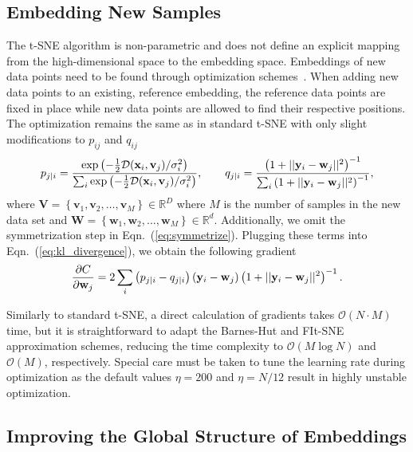 \documentclass[article]{jss}
\begin{document}
\subsection{Embedding New Samples} \label{sec:meth.transform}

The t-SNE algorithm is non-parametric and does not define an explicit mapping from the
high-dimensional space to the embedding space. Embeddings of new data
points need to be found through optimization
schemes~\citep{policar2021embedding}. When adding new data points to an
existing, reference embedding, the reference data points are fixed in place
while new data points are allowed to find their respective positions. The
optimization remains the same as in standard t-SNE with only slight
modifications to $p_{ij}$ and $q_{ij}$
\begin{align}
p_{j \mid i} = \frac{\exp \left ( -\frac{1}{2} \mathcal{D}(\mathbf{x}_i, \mathbf{v}_j) /  \sigma_i^2 \right )}{\sum_{i} \exp \left ( -\frac{1}{2} \mathcal{D}(\mathbf{x}_i, \mathbf{v}_j) / \sigma_i^2 \right )}, \qquad
q_{j \mid i} = \frac{\left ( 1 + || \mathbf{y}_i - \mathbf{w}_j ||^2 \right )^{-1}}{\sum_{i}\left ( 1 + || \mathbf{y}_i - \mathbf{w}_j ||^2 \right )^{-1}}, \notag
\end{align}
\noindent where $\mathbf{V} = \left \{ \mathbf{v}_1, \mathbf{v}_2, \dots,
\mathbf{v}_M \right \} \in \mathbb{R}^D$ where $M$ is the number of samples in
the new data set and $\mathbf{W} = \left \{ \mathbf{w}_1, \mathbf{w}_2, \dots,
\mathbf{w}_M \right \} \in \mathbb{R}^d$. Additionally, we omit the
symmetrization step in Eqn.~(\ref{eq:symmetrize}). Plugging these terms into
Eqn.~(\ref{eq:kl_divergence}), we obtain the following gradient
\begin{equation}
\frac{\partial C}{\partial \mathbf{w}_j} = 2 \sum_i \left ( p_{j \mid i} - q_{j \mid i} \right ) \left ( \mathbf{y}_i - \mathbf{w}_j \right ) \left ( 1 + || \mathbf{y}_i - \mathbf{w}_j || ^2 \right )^{-1}. \notag
\label{eq:gradient}
\end{equation}

Similarly to standard t-SNE, a direct calculation of gradients takes
$\mathcal{O}(N \cdot M)$ time, but it is straightforward to adapt the Barnes-Hut
and FIt-SNE approximation schemes, reducing the time complexity to
$\mathcal{O}(M \log N)$ and $\mathcal{O}(M)$, respectively. Special care must be
taken to tune the learning rate during optimization as the default values
$\eta=200$ and $\eta=N/12$ result in highly unstable optimization.


\subsection{Improving the Global Structure of Embeddings} \label{sec:meth.global}
\end{document}
